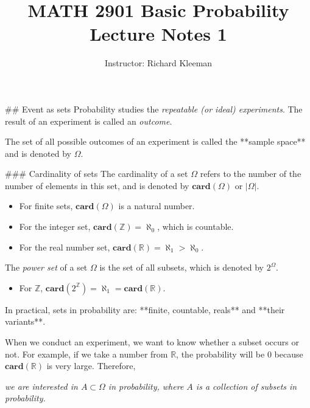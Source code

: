 


\title{MATH 2901 Basic Probability Lecture Notes 1}
\author{Instructor: Richard Kleeman}
\date{}
\maketitle


## Event as sets
Probability studies the \emph{repeatable (or ideal) experiments}. The result of an experiment is called an \emph{outcome}.

\begin{definition}
The set of all possible outcomes of an experiment is called the **sample space** and is denoted by $\Omega$.  
\end{definition}

### Cardinality of sets
The cardinality of a set $\Omega$ refers to the number of the number of elements in this set, and is denoted by $\mathbf{card}(\Omega)$ or $\left\vert \Omega \right\vert$.
\begin{itemize}
    \item For finite sets, $\mathbf{card}(\Omega)$ is a natural number.
    \item For the integer set, $\mathbf{card}(\mathbb{Z}) = \aleph_0$, which is countable.
    \item For the real number set, $\mathbf{card}(\mathbb{R}) = \aleph_1 > \aleph_0$.
\end{itemize}
The \emph{power set} of a set $\Omega$ is the set of all subsets, which is denoted by $2^\Omega$.
\begin{itemize}
    \item For $\mathbb{Z}$, $\mathbf{card}(2^\mathbb{Z}) = \aleph_1 = \mathbf{card}(\mathbb{R})$.
\end{itemize}

In practical, sets in probability are: **finite, countable, reals** and **their variants**.

When we conduct an experiment, we want to know whether a subset occurs or not. For example, if we take a number from $\mathbb{R}$, the probability will be 0 because $\mathbf{card}(\mathbb{R})$ is very large. Therefore,
\begin{center}
\emph{we are interested in $A \subset \Omega$ in probability, where $A$ is a collection of subsets in probability.}
\end{center}

